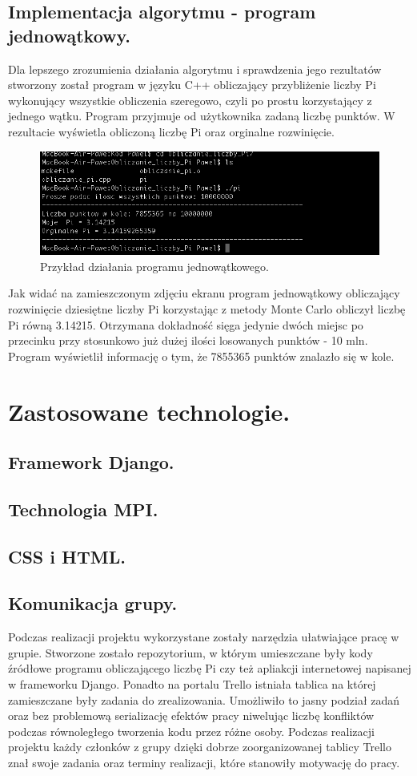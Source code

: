 \documentclass[a4paper,12pt]{article}		%
\begin{document}
\subsection{Implementacja algorytmu - program jednowątkowy.} 
Dla lepszego zrozumienia działania algorytmu i sprawdzenia jego rezultatów stworzony został program w języku C++ obliczający przybliżenie liczby Pi wykonujący wszystkie obliczenia szeregowo, czyli po prostu korzystający z jednego wątku. Program przyjmuje od użytkownika zadaną liczbę punktów. W rezultacie wyświetla obliczoną liczbę Pi oraz orginalne rozwinięcie.

\begin{figure}[h!]
\centering
\includegraphics[scale=0.6]{Resources/Screen_Program_JedenWatek}
\caption{Przykład działania programu jednowątkowego.} 
\end{figure}
Jak widać na zamieszczonym zdjęciu ekranu program jednowątkowy obliczający rozwinięcie dziesiętne liczby Pi korzystając z metody Monte Carlo obliczył liczbę Pi równą 3.14215. Otrzymana dokładność sięga jedynie dwóch miejsc po przecinku przy stosunkowo już dużej ilości losowanych punktów - 10 mln. Program wyświetlił informację o tym, że 7855365 punktów znalazło się w kole.
\section{Zastosowane technologie.}
\subsection{Framework Django.}
\subsection{Technologia MPI.}
\subsection{CSS i HTML.}
\subsection{Komunikacja grupy.}
Podczas realizacji projektu wykorzystane zostały narzędzia ułatwiające pracę w grupie. Stworzone zostało repozytorium, w którym umieszczane były kody źródłowe programu obliczającego liczbę Pi czy też apliakcji internetowej napisanej w frameworku Django. Ponadto na portalu Trello istniała tablica na której zamieszczane były zadania do zrealizowania. Umożliwiło to jasny podział zadań oraz bez problemową serializację efektów pracy niwelując liczbę konfliktów podczas równoległego tworzenia kodu przez różne osoby. Podczas realizacji projektu każdy członków z grupy dzięki dobrze zoorganizowanej tablicy Trello znał swoje zadania oraz terminy realizacji, które stanowiły motywację do pracy.
\end{document}
